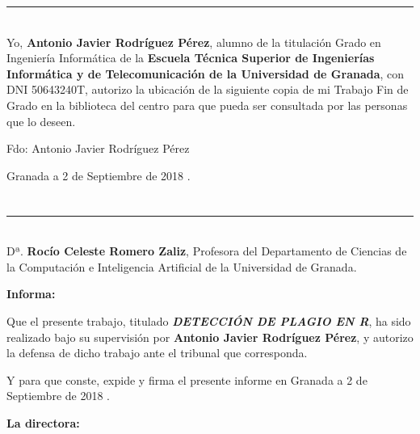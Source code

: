\noindent\rule[-1ex]{\textwidth}{2pt}\\[4.5ex]

Yo, \textbf{Antonio Javier Rodríguez Pérez}, alumno de la titulación Grado en Ingeniería Informática de la \textbf{Escuela Técnica Superior
de Ingenierías Informática y de Telecomunicación de la Universidad de Granada}, con DNI 50643240T, autorizo la
ubicación de la siguiente copia de mi Trabajo Fin de Grado en la biblioteca del centro para que pueda ser
consultada por las personas que lo deseen.

\vspace{6cm}

\noindent Fdo: Antonio Javier Rodríguez Pérez

\vspace{2cm}

\begin{flushright}
Granada a 2 de Septiembre de 2018 .
\end{flushright}


\chapter*{}
\thispagestyle{empty}

\noindent\rule[-1ex]{\textwidth}{2pt}\\[4.5ex]

Dª. \textbf{Rocío Celeste Romero Zaliz}, Profesora del Departamento de Ciencias de la Computación e Inteligencia Artificial de la Universidad de Granada.


\vspace{0.5cm}

\textbf{Informa:}

\vspace{0.5cm}

Que el presente trabajo, titulado \textit{\textbf{DETECCIÓN DE PLAGIO EN R}},
ha sido realizado bajo su supervisión por \textbf{Antonio Javier Rodríguez Pérez}, y autorizo la defensa de dicho trabajo ante el tribunal
que corresponda.

\vspace{0.5cm}

Y para que conste, expide y firma el presente informe en Granada a 2 de Septiembre de 2018 .

\vspace{1cm}

\textbf{La directora:}

\vspace{5cm}

